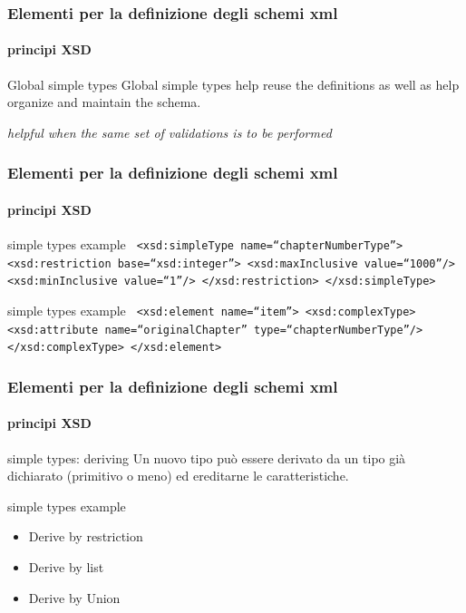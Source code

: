 \begin{frame}
	\frametitle{Elementi per la definizione degli schemi xml}
	\framesubtitle{principi XSD}
	\addtocounter{nframe}{1}

	\begin{block}{Global simple types}
		Global simple types help reuse the definitions as well as help organize and maintain the schema.
	\end{block}

	\textit{helpful when the same set of validations is to be performed}

\end{frame}


\begin{frame}
	\frametitle{Elementi per la definizione degli schemi xml}
	\framesubtitle{principi XSD}
	\addtocounter{nframe}{1}

	\begin{block}{simple types example}
		\texttt{
			<xsd:simpleType name=``chapterNumberType''>
			<xsd:restriction base=``xsd:integer''>
			<xsd:maxInclusive value=``1000''/>
			<xsd:minInclusive value=``1''/>
			</xsd:restriction>
			</xsd:simpleType>
		}
	\end{block}

	\begin{block}{simple types example}
		\texttt{
			<xsd:element name=``item''>
			<xsd:complexType>
			<xsd:attribute name=``originalChapter'' type=``chapterNumberType''/>
			</xsd:complexType>
			</xsd:element>
		}
	\end{block}
\end{frame}


\begin{frame}
	\frametitle{Elementi per la definizione degli schemi xml}
	\framesubtitle{principi XSD}
	\addtocounter{nframe}{1}

	\begin{block}{simple types: deriving}
		Un nuovo tipo può essere derivato da un tipo già dichiarato (primitivo o meno) ed ereditarne le caratteristiche.
	\end{block}

	\begin{block}{simple types example}
		\begin{itemize}
			\item Derive by restriction
			\item Derive by list
			\item Derive by Union
		\end{itemize}
	\end{block}

\end{frame}

